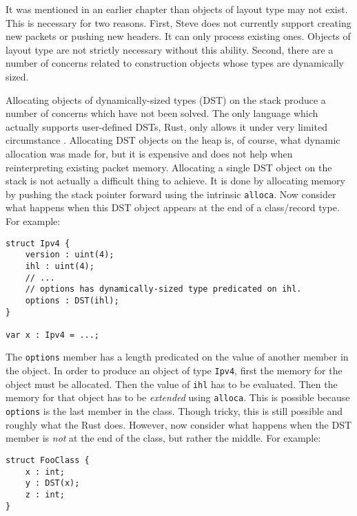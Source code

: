 It was mentioned in an earlier chapter than objects of layout type may not exist.
This is necessary for two reasons.
First, Steve does not currently support creating new packets or pushing new headers.
It can only process existing ones.
Objects of layout type are not strictly necessary without this ability.
Second, there are a number of concerns related to construction objects whose
types are dynamically sized.

Allocating objects of dynamically-sized types (DST) on the stack produce a number of concerns which have not been solved.
The only language which actually supports user-defined DSTs, Rust, only allows it under
very limited circumstance \cite{rust_dst_std}.
Allocating DST objects on the heap is, of course, what dynamic allocation was made for, but
it is expensive and does not help when reinterpreting existing packet memory.
Allocating a single DST object on the stack is not actually a difficult thing to achieve.
It is done by allocating memory by pushing the stack pointer forward using the intrinsic
\texttt{alloca}.
Now consider what happens when this DST object appears at the end of a class/record
type. For example:

\begin{codepage}
\begin{lstlisting}
struct Ipv4 {
	version : uint(4);
	ihl : uint(4);
	// ...
	// options has dynamically-sized type predicated on ihl.
	options : DST(ihl);
}

var x : Ipv4 = ...;
\end{lstlisting}
\end{codepage}

The \texttt{options} member has a length predicated on the value
of another member in the object. In order to produce an object of type \texttt{Ipv4},
first the memory for the object must be allocated. Then the value of \texttt{ihl}
has to be evaluated. Then the memory for that object has to be \emph{extended}
using \texttt{alloca}. This is possible because \texttt{options} is the last member in the class. Though tricky, this is still possible and roughly what the Rust does.
However, now consider what happens when the DST member is \emph{not} at the end
of the class, but rather the middle. For example:

\begin{codepage}
\begin{lstlisting}
struct FooClass {
	x : int;
	y : DST(x);
	z : int;
}
\end{lstlisting}
\end{codepage}

